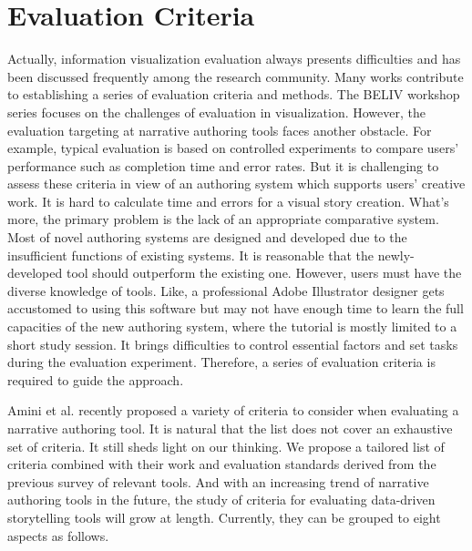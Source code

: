 \section{Evaluation Criteria}

Actually, information visualization evaluation always presents difficulties and has been discussed frequently among the research community. Many works \cite{Plaisant2004, Lam2012} contribute to establishing a series of evaluation criteria and methods. The BELIV workshop series focuses on the challenges of evaluation in visualization. However, the evaluation targeting at narrative authoring tools faces another obstacle. For example, typical evaluation is based on controlled experiments to compare users' performance such as completion time and error rates. But it is challenging to assess these criteria in view of an authoring system which supports users' creative work. It is hard to calculate time and errors for a visual story creation. What's more, the primary problem is the lack of an appropriate comparative system. Most of novel authoring systems are designed and developed due to the insufficient functions of existing systems. It is reasonable that the newly-developed tool should outperform the existing one. However, users must have the diverse knowledge of tools. Like, a professional Adobe Illustrator designer gets accustomed to using this software but may not have enough time to learn the full capacities of the new authoring system, where the tutorial is mostly limited to a short study session. It brings difficulties to control essential factors and set tasks during the evaluation experiment. Therefore, a series of evaluation criteria is required to guide the approach.

Amini et al. \cite{Amini2018a} recently proposed a variety of criteria to consider when evaluating a narrative authoring tool. It is natural that the list does not cover an exhaustive set of criteria. It still sheds light on our thinking. We propose a tailored list of criteria combined with their work and evaluation standards derived from the previous survey of relevant tools. And with an increasing trend of narrative authoring tools in the future, the study of criteria for evaluating data-driven storytelling tools will grow at length. Currently, they can be grouped to eight aspects as follows. 

